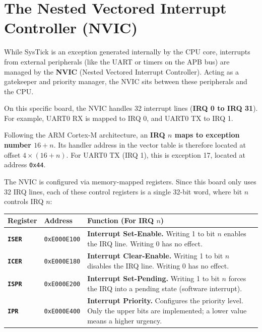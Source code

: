 \section{The Nested Vectored Interrupt Controller (NVIC)}
While SysTick is an exception generated internally by the CPU core, interrupts from external peripherals (like the UART or timers on the APB bus) are managed by the \textbf{NVIC} (Nested Vectored Interrupt Controller). Acting as a gatekeeper and priority manager, the NVIC sits between these peripherals and the CPU.

On this specific board, the NVIC handles 32 interrupt lines (\textbf{IRQ 0 to IRQ 31}). For example, UART0 RX is mapped to IRQ 0, and UART0 TX to IRQ 1. 

Following the ARM Cortex-M architecture, an \textbf{IRQ $n$ maps to exception number $16 + n$}. Its handler address in the vector table is therefore located at offset $4 \times (16 + n)$. For UART0 TX (IRQ 1), this is exception 17, located at address \texttt{0x44}.

The NVIC is configured via memory-mapped registers. Since this board only uses 32 IRQ lines, each of these control registers is a single 32-bit word, where bit $n$ controls IRQ $n$:

\begin{table}[h!]
    \centering
    \begin{tabular}{llp{8.5cm}}
        \toprule
        \textbf{Register} & \textbf{Address} & \textbf{Function (For IRQ $n$)} \\
        \midrule
        \textbf{\texttt{ISER}} & \texttt{0xE000E100} & \textbf{Interrupt Set-Enable.} Writing 1 to bit $n$ enables the IRQ line. Writing 0 has no effect. \\
        \textbf{\texttt{ICER}} & \texttt{0xE000E180} & \textbf{Interrupt Clear-Enable.} Writing 1 to bit $n$ disables the IRQ line. Writing 0 has no effect. \\
        \textbf{\texttt{ISPR}} & \texttt{0xE000E200} & \textbf{Interrupt Set-Pending.} Writing 1 to bit $n$ forces the IRQ into a pending state (software interrupt). \\
        \textbf{\texttt{IPR}}  & \texttt{0xE000E400} & \textbf{Interrupt Priority.} Configures the priority level. Only the upper bits are implemented; a lower value means a higher urgency. \\
        \bottomrule
    \end{tabular}
\end{table}

